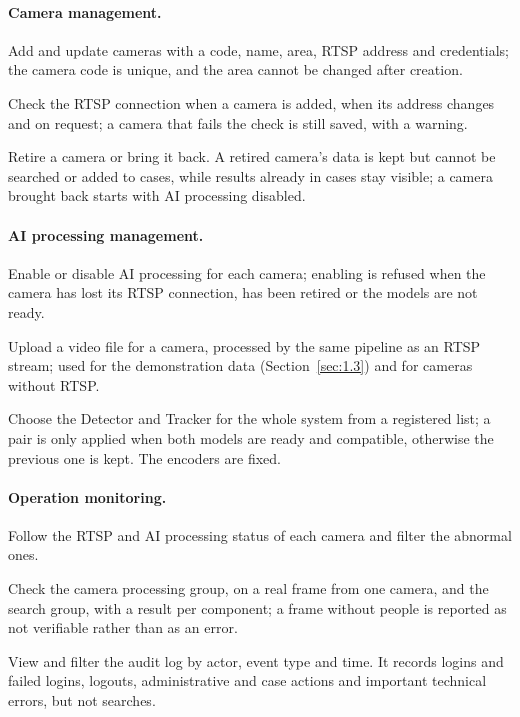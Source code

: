 \paragraph{Camera management.}
\begin{reqlist}
    \item[FR-A03] Add and update cameras with a code, name, area, RTSP address and credentials; the camera code is unique, and the area cannot be changed after creation.
    \item[FR-A04] Check the RTSP connection when a camera is added, when its address changes and on request; a camera that fails the check is still saved, with a warning.
    \item[FR-A05] Retire a camera or bring it back. A retired camera's data is kept but cannot be searched or added to cases, while results already in cases stay visible; a camera brought back starts with AI processing disabled.
\end{reqlist}

\paragraph{AI processing management.}
\begin{reqlist}
    \item[FR-A06] Enable or disable AI processing for each camera; enabling is refused when the camera has lost its RTSP connection, has been retired or the models are not ready.
    \item[FR-A07] Upload a video file for a camera, processed by the same pipeline as an RTSP stream; used for the demonstration data (Section~\ref{sec:1.3}) and for cameras without RTSP.
    \item[FR-A08] Choose the Detector and Tracker for the whole system from a registered list; a pair is only applied when both models are ready and compatible, otherwise the previous one is kept. The encoders are fixed.
\end{reqlist}

\paragraph{Operation monitoring.}
\begin{reqlist}
    \item[FR-A09] Follow the RTSP and AI processing status of each camera and filter the abnormal ones.
    \item[FR-A10] Check the camera processing group, on a real frame from one camera, and the search group, with a result per component; a frame without people is reported as not verifiable rather than as an error.
    \item[FR-A11] View and filter the audit log by actor, event type and time. It records logins and failed logins, logouts, administrative and case actions and important technical errors, but not searches.
\end{reqlist}

